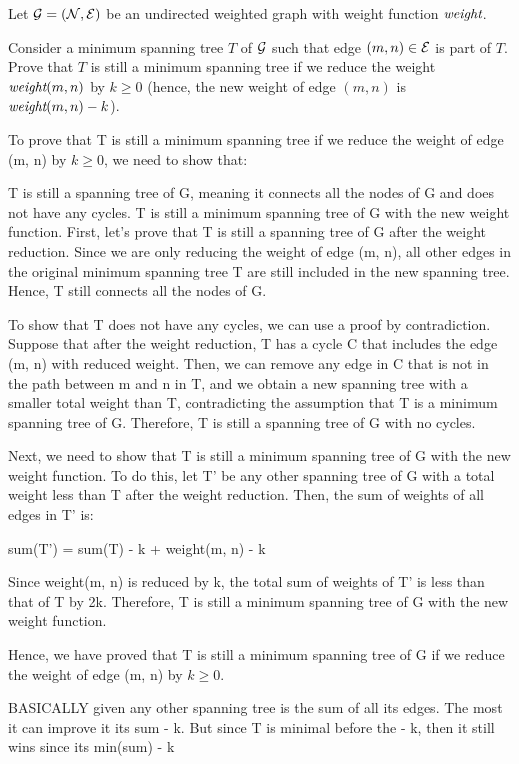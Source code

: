 \begin{problem}
Let $\mathcal{G} = (\mathcal{N}, \mathcal{E})$ be an undirected weighted graph with weight function $\mathord{\textit{weight}}$. 
\begin{questions}
\item Consider a minimum spanning tree $T$ of $\mathcal{G}$ such that edge $(m, n) \in \mathcal{E}$ is part of $T$. Prove that $T$ is still a minimum spanning tree if we reduce the weight $\mathord{\textit{weight}}{(m, n)}$ by $k \geq 0$ (hence, the new weight of edge $(m, n)$ is $\mathord{\textit{weight}}{(m, n)} - k$).

To prove that T is still a minimum spanning tree if we reduce the weight of edge (m, n) by $k \geq 0$, we need to show that:

T is still a spanning tree of G, meaning it connects all the nodes of G and does not have any cycles.
T is still a minimum spanning tree of G with the new weight function.
First, let's prove that T is still a spanning tree of G after the weight reduction. Since we are only reducing the weight of edge (m, n), all other edges in the original minimum spanning tree T are still included in the new spanning tree. Hence, T still connects all the nodes of G.

To show that T does not have any cycles, we can use a proof by contradiction. Suppose that after the weight reduction, T has a cycle C that includes the edge (m, n) with reduced weight. Then, we can remove any edge in C that is not in the path between m and n in T, and we obtain a new spanning tree with a smaller total weight than T, contradicting the assumption that T is a minimum spanning tree of G. Therefore, T is still a spanning tree of G with no cycles.

Next, we need to show that T is still a minimum spanning tree of G with the new weight function. To do this, let T' be any other spanning tree of G with a total weight less than T after the weight reduction. Then, the sum of weights of all edges in T' is:

sum(T') = sum(T) - k + weight(m, n) - k

Since weight(m, n) is reduced by k, the total sum of weights of T' is less than that of T by 2k. Therefore, T is still a minimum spanning tree of G with the new weight function.

Hence, we have proved that T is still a minimum spanning tree of G if we reduce the weight of edge (m, n) by $k \geq 0$.


BASICALLY given any other spanning tree is the sum of all its edges. The most it can improve it its sum - k. But since T is minimal before the - k, then it still wins since its min(sum) - k


\end{questions}
\end{problem}
